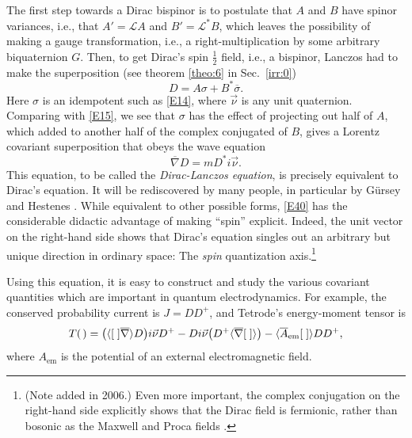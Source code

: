 \documentclass [12pt,a4paper      ]{article}
\newcommand{\CON}{\overline}          %
\newcommand{\SCA}{\langle}            %
\newcommand{\LAR}{\rangle}            %
\newcommand{\Q}{[\hspace{1.mm}]} %
\newcommand{\A}{(\hspace{.5mm})} %
\begin{document}
     The first step towards a Dirac bispinor is to postulate that 
$A$ and $B$ have spinor variances,  i.e., that  $A'= \mathcal{L}A$ and $B'= \mathcal{L}^* B$,  which 
leaves the possibility of making a gauge transformation,  i.e.,  a 
right-multiplication by some arbitrary biquaternion $G$.   Then, to 
get  Dirac's spin $\tfrac{1}{2}$ field, i.e., a bispinor, Lanczos had to make the superposition (see theorem \ref{theo:6} in Sec.~\ref{irr:0})
%
\begin{equation}\label{E39}
                D =  A \sigma  +  B^* \CON{\sigma}.  %
\end{equation}
%
Here $\sigma$ is an idempotent such as \eqref{E14}, where  
$ \vec{\nu}$ is any unit quaternion.  Comparing with \eqref{E15},  we see 
that $\sigma$ has the effect of projecting out half of $A$, which added to 
another half of the complex conjugated of $B$,  gives  a  Lorentz 
covariant superposition that obeys the wave equation
%
\begin{equation}\label{E40}
             \CON{\nabla} D = m D^* i \vec{\nu}.   %
\end{equation}
%
This equation, to be called  the \emph{Dirac-Lanczos  equation},  is 
precisely   equivalent   to  Dirac's  equation.    It   will   be 
rediscovered  by  many people,  in particular by G\"ursey \cite{R29} and 
Hestenes \cite{R30}.   While equivalent to other possible  forms,  \eqref{E40} 
has the considerable didactic advantage of making ``spin'' explicit.  
Indeed,  the unit vector on the right-hand side shows  that  Dirac's 
equation  singles  out  an  arbitrary  but  unique  direction  in 
ordinary space:  The \emph{spin} quantization axis.\footnote{(Note added in 2006.) Even more important, the complex conjugation on the right-hand side explicitly shows that the Dirac field is fermionic, rather than bosonic as the Maxwell and Proca fields \cite{R27,R61}.}

     Using this equation,  it is easy to construct and study  the 
various  covariant  quantities  which are  important  in  quantum 
electrodynamics.   For example, the conserved probability current 
is $J=DD^+$, and Tetrode's energy-moment tensor is
%
\begin{equation}\label{E41} 
                T\A = \bigl(\SCA \Q \CON{\nabla}\LAR D\bigr) i\vec{\nu} D^+ -
 Di\vec{\nu} \bigl(D^+ \SCA\CON{\nabla}\Q \LAR\bigr) -
                      \SCA\CON{A}_{\text{em}}\Q \LAR DD^+,        %
\end{equation}
%
where $A_{\text{em}}$ is the potential of an external electromagnetic field.
\end{document}
